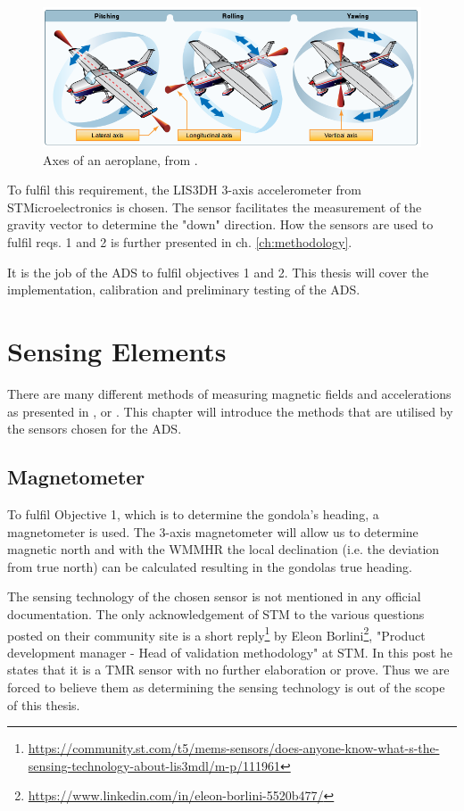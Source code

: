 \begin{figure}[H]
    \centering
    \includegraphics[width=0.75\linewidth]{images/01_background/axes_of_an_airplane.png}
    \caption[Axes of an aeroplane]{Axes of an aeroplane, from \parencite{pilot-handbook}.}
    \label{fig:attitude}
\end{figure}


To fulfil this requirement, the LIS3DH 3-axis accelerometer from STMicroelectronics is chosen. The sensor facilitates the measurement of the gravity vector to determine the "down" direction. How the sensors are used to fulfil reqs. 1 and 2 is further presented in ch. \ref{ch:methodology}.

It is the job of the \ac{ADS} to fulfil objectives 1 and 2. This thesis will cover the implementation, calibration and preliminary testing of the \ac{ADS}.

\section{Sensing Elements \label{sec:bg:sensing_elements}}
There are many different methods of measuring magnetic fields and accelerations as presented in \parencite{}, \parencite{} or \parencite{}. This chapter will introduce the methods that are utilised by the sensors chosen for the \ac{ADS}.

\subsection{Magnetometer \label{sec:bg:magnetometers}}
To fulfil Objective 1, which is to determine the gondola's heading, a magnetometer is used. The 3-axis magnetometer will allow us to determine magnetic north and with the \ac{WMMHR} the local declination (i.e. the deviation from true north) can be calculated resulting in the gondolas true heading. 

The sensing technology of the chosen sensor is not mentioned in any official documentation. The only acknowledgement of \ac{STM} to the various questions posted on their community site is a short reply\footnote{\url{https://community.st.com/t5/mems-sensors/does-anyone-know-what-s-the-sensing-technology-about-lis3mdl/m-p/111961}} by Eleon Borlini\footnote{\url{https://www.linkedin.com/in/eleon-borlini-5520b477/}}, "Product development manager - Head of validation methodology" at \ac{STM}. In this post he states that it is a \ac{TMR} sensor with no further elaboration or prove. Thus we are forced to believe them as determining the sensing technology is out of the scope of this thesis.

